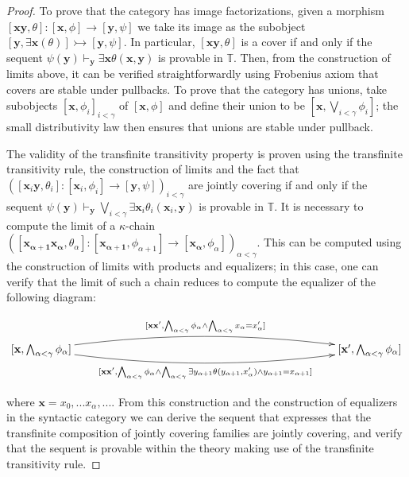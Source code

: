 \documentclass[a4paper,11pt]{article}
\theoremstyle{plain}
\theoremstyle{plain}
\theoremstyle{remark}
\newcommand{\theory}{\ensuremath{\mathbb{T}}}
\begin{document}
\begin{proof}
To prove that the category has image factorizations, given a morphism $[\mathbf{x}\mathbf{y}, \theta]: [\mathbf{x}, \phi] \rightarrow [\mathbf{y}, \psi]$ we take its image as the subobject $[\mathbf{y}, \exists \mathbf{x} (\theta)] \rightarrowtail [\mathbf{y}, \psi]$. In particular, $[\mathbf{x}\mathbf{y}, \theta]$ is a cover if and only if the sequent $\psi(\mathbf{y}) \vdash_{\mathbf{y}} \exists \mathbf{x} \theta(\mathbf{x}, \mathbf{y})$ is provable in $\theory$. Then, from the construction of limits above, it can be verified straightforwardly using Frobenius axiom that covers are stable under pullbacks. To prove that the category has unions, take subobjects $[\mathbf{x}, \phi_i]_{i<\gamma}$ of $[\mathbf{x}, \phi]$ and define their union to be $[\mathbf{x}, \bigvee_{i<\gamma} \phi_i]$; the small distributivity law then ensures that unions are stable under pullback.

The validity of the transfinite transitivity property is proven using the transfinite transitivity rule, the construction of limits and the fact that $([\mathbf{x}_i\mathbf{y}, \theta_i]: [\mathbf{x}_i, \phi_i] \rightarrow [\mathbf{y}, \psi])_{i<\gamma}$ are jointly covering if and only if the sequent $\psi(\mathbf{y}) \vdash_{\mathbf{y}} \bigvee_{i<\gamma} \exists \mathbf{x}_i \theta_i(\mathbf{x}_i, \mathbf{y})$ is provable in $\theory$. It is necessary to compute the limit of a $\kappa$-chain $([\mathbf{x_{\alpha+1}}\mathbf{x_{\alpha}}, \theta_{\alpha}]: [\mathbf{x_{\alpha+1}}, \phi_{\alpha+1}] \to [\mathbf{x_{\alpha}}, \phi_{\alpha}])_{\alpha<\gamma}$. This can be computed using the construction of limits with products and equalizers; in this case, one can verify that the limit of such a chain reduces to compute the equalizer of the following diagram:
 
 
 \begin{displaymath}
\xymatrix{
[\mathbf{x}, \bigwedge_{\alpha<\gamma} \phi_{\alpha}] \ar@/^{1pc}/[rrrrrrrr]^{[\mathbf{x}\mathbf{x}', \bigwedge_{\alpha<\gamma} \phi_{\alpha} \wedge \bigwedge_{\alpha<\gamma} x_{\alpha}=x_{\alpha}']} \ar@/_{1pc}/[rrrrrrrr]_{[\mathbf{x}\mathbf{x}', \bigwedge_{\alpha<\gamma} \phi_{\alpha} \wedge \bigwedge_{\alpha<\gamma} \exists y_{\alpha+1}  \theta(y_{\alpha+1}, x_{\alpha}') \wedge y_{\alpha+1}=x_{\alpha+1}]} & & & & & & & & [\mathbf{x'}, \bigwedge_{\alpha<\gamma} \phi_{\alpha}]\\
}
\end{displaymath}

\noindent where $\mathbf{x}=x_0, ...x_{\alpha}, ...$. From this construction and the construction of equalizers in the syntactic category we can derive the sequent that expresses that the transfinite composition of jointly covering families are jointly covering, and verify that the sequent is provable within the theory making use of the transfinite transitivity rule.


\end{proof}
\end{document}
